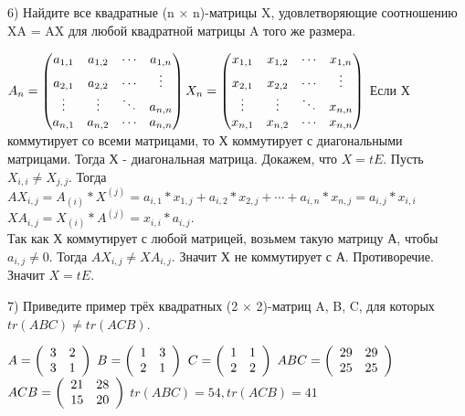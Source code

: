 \documentclass[12pt, a4paper]{article}
\begin{document}
	6) Найдите все квадратные (n × n)-матрицы X, удовлетворяющие соотношению XA = AX для любой квадратной матрицы A того же размера. \bspace
	
	$\matA \matX$ \bspace
	Если Х коммутирует со всеми матрицами, то Х коммутирует с диагональными  матрицами. Тогда Х - диагональная матрица. Докажем, что $X = tE$. Пусть $X_{i, i} \neq X_{j, j}$. Тогда $AX_{i, j} = A_{(i)} * X ^ {(j)} = a_{i, 1} * x_{1, j} + a_{i, 2} * x_{2, j} + \cdots + a_{i, n} * x_{n, j} = a_{i, j} * x_{i, i}$\\
	 $XA_{i,j} = X_{(i)} * A^{(j)} = x_{i, i} * a_{i, j}$. \\
	 Так как Х коммутирует с любой матрицей, возьмем такую матрицу А, чтобы $a_{i, j} \neq 0$. Тогда 	$AX_{i, j}  \neq XA_{i,j}$. Значит Х не коммутирует с А. Противоречие. Значит $X = tE$. \bspace
	
	7) Приведите пример трёх квадратных (2 × 2)-матриц A, B, C, для которых $tr(ABC) \neq tr(ACB)$. \bspace
	
	$A = \left ( \begin{array}{rr} {3} & {2}\\ {3} & {1} \end{array} \right )$
	$B = \left ( \begin{array}{rr} {1} & {3}\\ {2} & {1} \end{array} \right )$
	$C = \left ( \begin{array}{rr} {1} & {1}\\ {2} & {2} \end{array} \right )$ \bspace
	$ABC = \left ( \begin{array}{rr} {29} & {29}\\ {25} & {25} \end{array} \right )$
	$ACB = \left ( \begin{array}{rr} {21} & {28}\\ {15} & {20} \end{array} \right )$\bspace
	$tr(ABC) = 54, tr(ACB) = 41$
	
\end{document}
